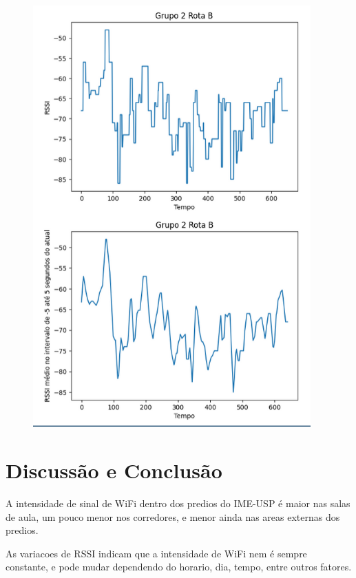 \documentclass{article}
\begin{document}
\begin{figure}
  \begin{center}
    \includegraphics[width=0.95\textwidth]{figures/grupo_2-rota_b}
  \end{center}
  \caption{}\label{fig:}
\end{figure}


\section{Discussão e Conclusão}
A intensidade de sinal de WiFi dentro dos predios do IME-USP é maior nas salas de aula, um pouco
menor nos corredores, e menor ainda nas areas externas dos predios.  

As variacoes de RSSI indicam que a intensidade de WiFi nem é sempre constante, e pode mudar
dependendo do horario, dia, tempo, entre outros fatores. 
\end{document}
